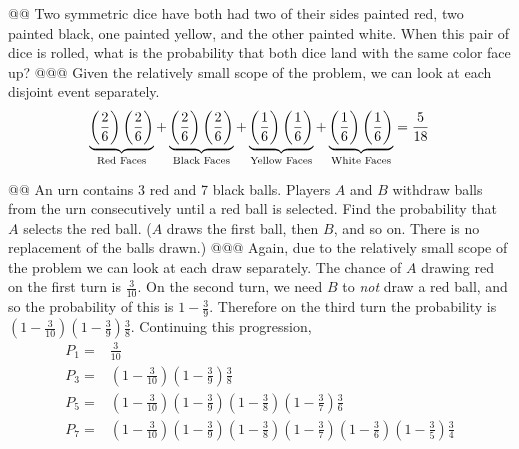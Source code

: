 \documentclass[10pt]{article}
\begin{document}
\begin{easylist}[enumerate]
    @@ Two symmetric dice have both had two of their sides painted red, two painted black, one painted yellow, and the other painted white. When this pair of dice is rolled, what is the probability that both dice land with the same color face up?
    @@@ Given the relatively small scope of the problem, we can look at each disjoint event separately.
        \[
            \underbrace{%
                \left( \frac{2}{6} \right)
                \left( \frac{2}{6} \right)
            }_{\text{Red Faces} }
            +
            \underbrace{%
            \left( \frac{2}{6} \right)
            \left( \frac{2}{6} \right)
            }_{\text{Black Faces} }
            +
            \underbrace{%
            \left( \frac{1}{6} \right)
            \left( \frac{1}{6} \right)
            }_{\text{Yellow Faces} }
            +
            \underbrace{%
            \left( \frac{1}{6} \right)
            \left( \frac{1}{6} \right)
            }_{\text{White Faces} }
            =
            \frac{5}{18}
        \]

    @@ An urn contains 3 red and 7 black balls. Players $A$ and $B$ withdraw balls from the urn consecutively until a red ball is selected. Find the probability that $A$ selects the red ball. ($A$ draws the first ball, then $B$, and so on. There is no replacement of the balls drawn.)
    @@@ Again, due to the relatively small scope of the problem we can look at each draw separately. The chance of $A$ drawing red on the first turn is $\frac{3}{10}$. On the second turn, we need $B$ to \textit{not} draw a red ball, and so the probability of this is $1 - \frac{3}{9}$. Therefore on the third turn the probability is $\left( 1 - \frac{3}{10}\right) \left(1 - \frac{3}{9} \right) \frac{3}{8}$. Continuing this progression,
        \[
            \begin{aligned}
                P_1 =& \frac{3}{10}\\
                P_3 =& \left( 1 - \frac{3}{10}\right) \left(1 - \frac{3}{9} \right) \frac{3}{8}\\
                P_5 =& \left( 1 - \frac{3}{10}\right) \left(1 - \frac{3}{9} \right) \left( 1 - \frac{3}{8} \right) \left( 1 - \frac{3}{7} \right) \frac{3}{6}\\
                P_7 =& \left( 1 - \frac{3}{10}\right) \left(1 - \frac{3}{9} \right) \left( 1 - \frac{3}{8} \right) \left( 1 - \frac{3}{7} \right) \left( 1 - \frac{3}{6}\right) \left(1 - \frac{3}{5} \right) \frac{3}{4}\\
            \end{aligned}
        \]


\end{easylist}
\end{document}
